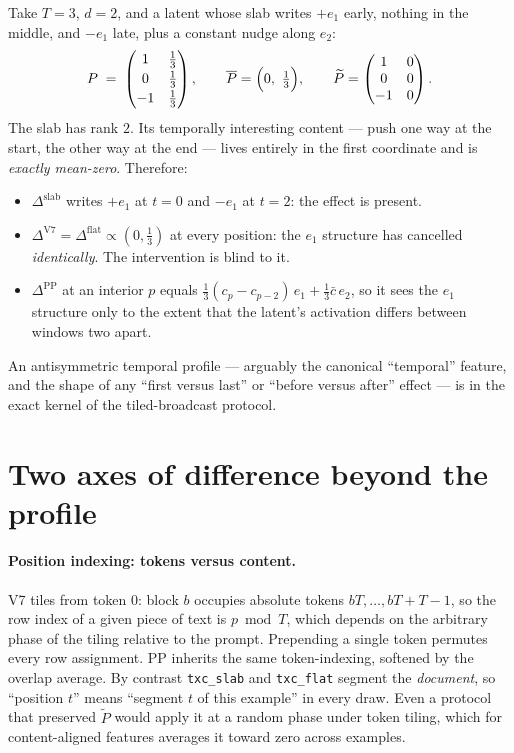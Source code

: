 \documentclass[11pt]{article}
\theoremstyle{definition}
\newcommand{\slab}{P}
\newcommand{\dc}{\overline{\slab}}
\newcommand{\ac}{\widetilde{\slab}}
\begin{document}
Take $T=3$, $d=2$, and a latent whose slab writes $+e_1$ early, nothing in the middle, and
$-e_1$ late, plus a constant nudge along $e_2$:
\begin{equation}
  \slab \;=\;
  \begin{pmatrix}
    1 & \tfrac13\\[2pt]
    0 & \tfrac13\\[2pt]
   -1 & \tfrac13
  \end{pmatrix},
  \qquad
  \dc = \Bigl(0,\ \tfrac13\Bigr),
  \qquad
  \ac = \begin{pmatrix} 1 & 0\\ 0&0\\ -1&0\end{pmatrix}.
\end{equation}
The slab has rank $2$. Its temporally interesting content --- push one way at the start, the
other way at the end --- lives entirely in the first coordinate and is \emph{exactly mean-zero}.
Therefore:
\begin{itemize}
  \item $\Delta^{\mathrm{slab}}$ writes $+e_1$ at $t=0$ and $-e_1$ at $t=2$: the effect is present.
  \item $\Delta^{\mathrm{V7}} = \Delta^{\mathrm{flat}} \propto (0,\tfrac13)$ at every position:
        the $e_1$ structure has cancelled \emph{identically}. The intervention is blind to it.
  \item $\Delta^{\mathrm{PP}}$ at an interior $p$ equals
        $\tfrac13(c_p - c_{p-2})\,e_1 + \tfrac13\bar c\,e_2$, so it sees the $e_1$ structure only
        to the extent that the latent's activation differs between windows two apart.
\end{itemize}
An antisymmetric temporal profile --- arguably the canonical ``temporal'' feature, and the shape
of any ``first versus last'' or ``before versus after'' effect --- is in the exact kernel of the
tiled-broadcast protocol.

\section{Two axes of difference beyond the profile}

\paragraph{Position indexing: tokens versus content.}
V7 tiles from token $0$: block $b$ occupies absolute tokens $bT,\dots,bT+T-1$, so the row index
of a given piece of text is $p \bmod T$, which depends on the arbitrary phase of the tiling
relative to the prompt. Prepending a single token permutes every row assignment. PP inherits the
same token-indexing, softened by the overlap average. By contrast \texttt{txc\_slab} and
\texttt{txc\_flat} segment the \emph{document}, so ``position $t$'' means ``segment $t$ of this
example'' in every draw. Even a protocol that preserved $\ac$ would apply it at a random phase
under token tiling, which for content-aligned features averages it toward zero across examples.
\end{document}
